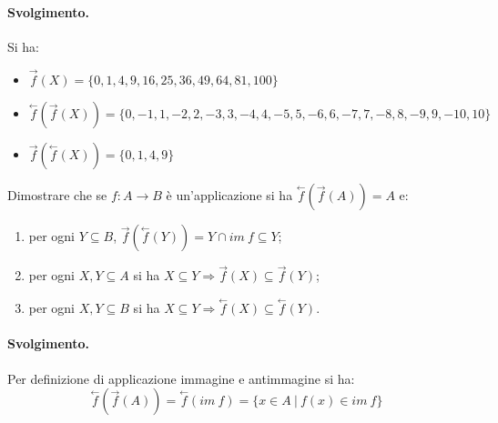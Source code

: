 \paragraph*{Svolgimento.} Si ha:
\begin{itemize}
	\item $\stackrel{\rightarrow}{f}(X)=\{0,1,4,9,16,25,36,49,64,81,100\}$
	\item $\stackrel{\leftarrow}{f}(\stackrel{\rightarrow}{f}(X))=\{0,-1,1,-2,2,-3,3,-4,4,-5,5,-6,6,-7,7,-8,8,-9,9,-10,10\}$
	\item $\stackrel{\rightarrow}{f}(\stackrel{\leftarrow}{f}(X))=\{0,1,4,9\}$ \hfill \blacksquare
\end{itemize}
\begin{exsbox}
	Dimostrare che se $f: A \longrightarrow B$ è un'applicazione si ha $\stackrel{\leftarrow}{f}(\stackrel{\rightarrow}{f}(A))=A$ e:
	\begin{enumerate}
		\item per ogni $Y \subseteq B$, $\stackrel{\rightarrow}{f}(\stackrel{\leftarrow}{f}(Y))=Y \cap im \ f \subseteq Y$;
		\item per ogni $X,Y \subseteq A$ si ha $X \subseteq Y \Rightarrow \stackrel{\rightarrow}{f}(X) \subseteq \stackrel{\rightarrow}{f}(Y)$;
		\item per ogni $X,Y \subseteq B$ si ha $X \subseteq Y \Rightarrow \stackrel{\leftarrow}{f}(X) \subseteq  \stackrel{\leftarrow}{f}(Y)$.
	\end{enumerate}
\end{exsbox}
\paragraph*{Svolgimento.}
Per definizione di applicazione immagine e antimmagine si ha:
\begin{displaymath}
	\stackrel { \leftarrow }{f} ( \stackrel{ \rightarrow}{f}(A) ) = \stackrel{\leftarrow}{f}( im \ f)= \{ x \in A \ | \ f(x) \in im \ f \}
\end{displaymath}

